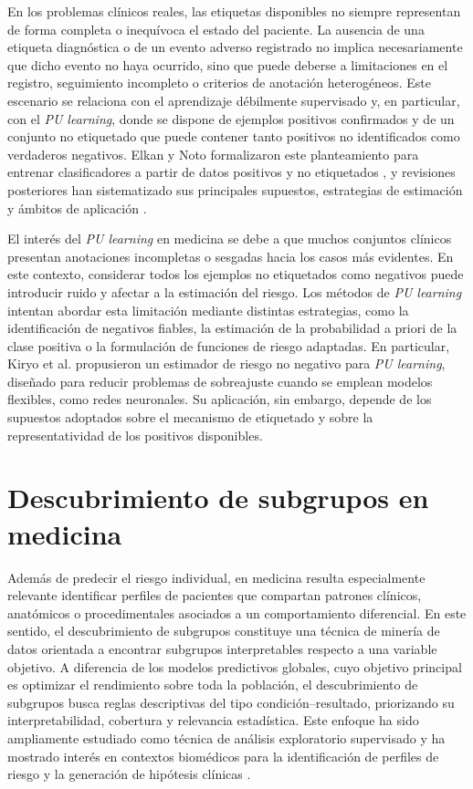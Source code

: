 En los problemas clínicos reales, las etiquetas disponibles no siempre representan de forma completa o inequívoca el estado del paciente. La ausencia de una etiqueta diagnóstica o de un evento adverso registrado no implica necesariamente que dicho evento no haya ocurrido, sino que puede deberse a limitaciones en el registro, seguimiento incompleto o criterios de anotación heterogéneos. Este escenario se relaciona con el aprendizaje débilmente supervisado y, en particular, con el \textit{PU learning}, donde se dispone de ejemplos positivos confirmados y de un conjunto no etiquetado que puede contener tanto positivos no identificados como verdaderos negativos. Elkan y Noto formalizaron este planteamiento para entrenar clasificadores a partir de datos positivos y no etiquetados \cite{Elkan2008}, y revisiones posteriores han sistematizado sus principales supuestos, estrategias de estimación y ámbitos de aplicación \cite{Bekker2020}.

El interés del \textit{PU learning} en medicina se debe a que muchos conjuntos clínicos presentan anotaciones incompletas o sesgadas hacia los casos más evidentes. En este contexto, considerar todos los ejemplos no etiquetados como negativos puede introducir ruido y afectar a la estimación del riesgo. Los métodos de \textit{PU learning} intentan abordar esta limitación mediante distintas estrategias, como la identificación de negativos fiables, la estimación de la probabilidad a priori de la clase positiva o la formulación de funciones de riesgo adaptadas. En particular, Kiryo et al. \cite{Kiryo2017} propusieron un estimador de riesgo no negativo para \textit{PU learning}, diseñado para reducir problemas de sobreajuste cuando se emplean modelos flexibles, como redes neuronales. Su aplicación, sin embargo, depende de los supuestos adoptados sobre el mecanismo de etiquetado y sobre la representatividad de los positivos disponibles.

\section{Descubrimiento de subgrupos en medicina}

Además de predecir el riesgo individual, en medicina resulta especialmente relevante identificar perfiles de pacientes que compartan patrones clínicos, anatómicos o procedimentales asociados a un comportamiento diferencial. En este sentido, el descubrimiento de subgrupos constituye una técnica de minería de datos orientada a encontrar subgrupos interpretables respecto a una variable objetivo. A diferencia de los modelos predictivos globales, cuyo objetivo principal es optimizar el rendimiento sobre toda la población, el descubrimiento de subgrupos busca reglas descriptivas del tipo condición--resultado, priorizando su interpretabilidad, cobertura y relevancia estadística. Este enfoque ha sido ampliamente estudiado como técnica de análisis exploratorio supervisado \cite{Herrera2011,Atzmueller2015} y ha mostrado interés en contextos biomédicos para la identificación de perfiles de riesgo y la generación de hipótesis clínicas \cite{Gamberger2002}.

